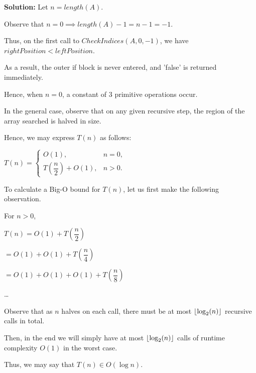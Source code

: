 \documentclass[a4,13pt]{extarticle}
\DeclarePairedDelimiter\floor{\lfloor}{\rfloor}
\newenvironment{Solution}{\color{blue}\textbf{Solution:}}{}
\begin{document}
\begin{enumerate}
\begin{enumerate}
	      	      
	        \begin{Solution}
Let $n=length(A)$.

Observe that $n=0\implies length(A)-1=n-1=-1$.

Thus, on the first call to $CheckIndices(A, 0, -1)$, we have $rightPosition<leftPosition$.

As a result, the outer if block is never entered, and 'false' is returned immediately.

Hence, when $n=0$, a constant of $3$ primitive operations occur.

In the general case, observe that on any given recursive step, the region of the array searched is halved in size.

Hence, we may express $T(n)$ as follows:

\begin{center}
$T(n)=\begin{cases}O(1), & n=0, \\ T\left(\dfrac{n}2\right)+O(1), & n>0.\end{cases}$ 
\end{center}

To calculate a Big-O bound for $T(n)$, let us first make the following observation.

\begin{center}
For $n>0$,

$T(n)=O(1)+T\left(\dfrac{n}2\right)$

$=O(1)+O(1)+T\left(\dfrac{n}4\right)$

$=O(1)+O(1)+O(1)+T\left(\dfrac{n}8\right)$

\dots
\end{center}

Observe that as $n$ halves on each call, there must be at most $\floor{\log_2(n)}$ recursive calls in total.

Then, in the end we will simply have at most $\floor{\log_2(n)}$ calls of runtime complexity $O(1)$ in the worst case.

Thus, we may say that $T(n)\in O(\log n)$.
	      	\end{Solution}
	      	

\end{enumerate}
\end{enumerate}
\end{document}
